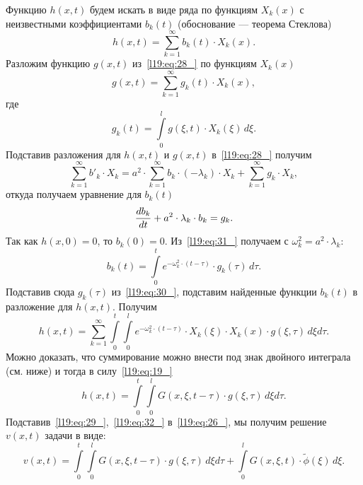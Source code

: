 Функцию $h(x,t)$ будем искать в виде ряда по функциям $X_k(x)$ с неизвестными коэффициентами $b_k(t)$ (обоснование --- теорема Стеклова)
\begin{equation*}
	h(x,t)=\sum\limits_{k=1}^{\infty}b_k(t)\cdot X_k(x).
\end{equation*}
Разложим функцию $g(x,t)$ из~\eqref{l19:eq:28_} по функциям $X_k(x)$
\begin{equation*}
	g(x,t)=\sum\limits_{k=1}^{\infty}g_k(t)\cdot X_k(x),
\end{equation*}
где
\begin{equation}\label{l19:eq:30_}
	g_k(t)=\int\limits_0^l g(\xi,t)\cdot X_k(\xi)\,d\xi.	
\end{equation}
Подставив разложения для $h(x,t)$ и $g(x,t)$ в~\eqref{l19:eq:28_} получим
\begin{equation*}
	\sum\limits_{k=1}^{\infty}b'_k\cdot X_k=a^2\cdot\sum\limits_{k=1}^{\infty}b_k\cdot(-\lambda_k)\cdot X_k+\sum\limits_{k=1}^{\infty}g_k\cdot X_k,
\end{equation*}
откуда получаем уравнение для $b_k(t)$
\begin{equation}\label{l19:eq:31_}
	\frac{db_k}{dt}+a^2\cdot\lambda_k\cdot b_k=g_k.
\end{equation}
Так как $h(x,0)=0$, то $b_k(0)=0$. Из~\eqref{l19:eq:31_} получаем с $\omega_k^2=a^2\cdot\lambda_k$:
\begin{equation*}
	b_k(t)=\int\limits_0^t e^{-\omega_k^2\cdot(t-\tau)}\cdot g_k(\tau)\,d\tau.
\end{equation*}
Подставив сюда $g_k(\tau)$ из~\eqref{l19:eq:30_}, подставим найденные функции $b_k(t)$ в разложение для $h(x,t)$. Получим
\begin{equation}\label{l19:eq:for_proof}
	h(x,t)=\sum\limits_{k=1}^{\infty}\int\limits_0^t\int\limits_0^l e^{-\omega_k^2\cdot(t-\tau)}\cdot X_k(\xi)\cdot X_k(x)\cdot g(\xi,\tau)\,d\xi d\tau.
\end{equation}
Можно доказать, что суммирование можно внести под знак двойного интеграла (см. ниже) и тогда в силу~\eqref{l19:eq:19_}
\begin{equation}\label{l19:eq:32_}
	h(x,t)=\int\limits_0^t\int\limits_0^l G(x,\xi,t-\tau)\cdot g(\xi,\tau)\,d\xi d\tau.
\end{equation}
Подставив~\eqref{l19:eq:29_},~\eqref{l19:eq:32_} в~\eqref{l19:eq:26_}, мы получим решение $v(x,t)$ задачи в виде:
\begin{equation}
	\label{l19:eq:33_}
	v(x,t)=\int\limits_0^t\int\limits_0^l G(x,\xi,t-\tau)\cdot g(\xi,\tau)\,d\xi d\tau+\int\limits_0^l G(x,\xi,t)\cdot \widetilde{\phi}(\xi)\,d\xi.	
\end{equation}  

